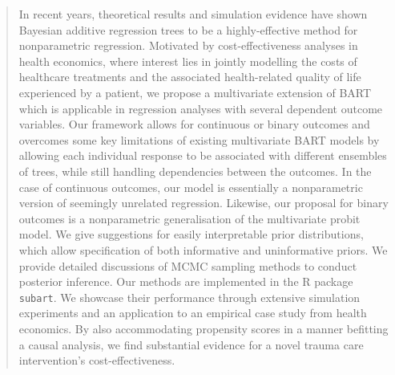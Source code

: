 \documentclass[aoas,preprint]{imsart}
\theoremstyle{plain}
\theoremstyle{definition}
\theoremstyle{remark}
\begin{document}
\begin{frontmatter}
\begin{aug}
\address[E]{Hamilton Institute and Department of Mathematics and Statistics, Maynooth University,}


\end{aug}

\begin{abstract}
In recent years, theoretical results and simulation evidence have shown Bayesian additive regression trees to be a highly-effective method for nonparametric regression. Motivated by cost-effectiveness analyses in health economics, where interest lies in jointly modelling the costs of healthcare treatments and the associated health-related quality of life experienced by a patient, we propose a multivariate extension of BART which is applicable in regression analyses with several dependent outcome variables.
Our framework allows for continuous or binary outcomes and overcomes some key limitations of existing multivariate BART models by allowing each individual response to be associated with different ensembles of trees, while still handling dependencies between the outcomes. In the case of continuous outcomes, our model is essentially a nonparametric version of seemingly unrelated regression. Likewise, our proposal for binary outcomes is a nonparametric generalisation of the multivariate probit model. We give suggestions for easily interpretable prior distributions, which allow specification of both informative and uninformative priors.
We provide detailed discussions of MCMC sampling methods to conduct posterior inference. Our methods are implemented in the \textsf{R} package \texttt{subart}. We showcase their performance through extensive simulation experiments and an application to an empirical case study from health economics. By also accommodating propensity scores in a manner befitting a causal analysis, we find substantial evidence for a novel trauma care intervention's cost-effectiveness.
\end{abstract}

\begin{keyword}
\end{keyword}

\end{frontmatter}
\end{document}
